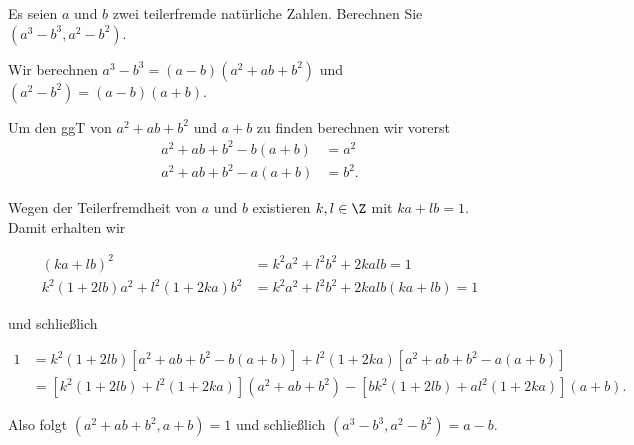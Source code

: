 
\begin{exercise}

Es seien $a$ und $b$ zwei teilerfremde natürliche Zahlen.
Berechnen Sie $(a^3 - b^3, a^2 - b^2)$.

\end{exercise}


\begin{solution}

Wir berechnen $a^3-b^3 = (a-b)(a^2 + ab + b^2)$ und $(a^2 - b^2) = (a-b)(a+b)$.

Um den ggT von $a^2+ab+b^2$ und $a+b$ zu finden berechnen wir vorerst
\begin{align*}
    a^2 + ab + b^2 - b(a+b) &= a^2 \\
    a^2 + ab + b^2 - a(a+b) &= b^2.
\end{align*}

Wegen der Teilerfremdheit von $a$ und $b$ 
existieren $k,l \in \Z$ mit $ka + lb = 1$. Damit erhalten wir

\begin{align*}
    (ka + l b)^2 &= k^2a^2 + l^2b^2 + 2kalb = 1 \\
    k^2(1 + 2lb)a^2 + l^2(1 + 2ka)b^2 &= k^2a^2 + l^2b^2 + 2kalb(ka + l b)
    = 1
\end{align*}

und schließlich

\begin{align*}
    1 &= k^2(1 + 2lb)[a^2 + ab + b^2 - b(a+b)] + l^2(1 + 2ka)[a^2 + ab + b^2 - a(a+b)] \\
    &=  [k^2(1 + 2lb) + l^2(1 + 2ka)](a^2 + ab + b^2) - [b k^2(1 + 2lb) + al^2(1 + 2ka)](a+b).
\end{align*}

Also folgt $(a^2 + ab + b^2, a + b) = 1$ und schließlich $(a^3 - b^3, a^2 - b^2) = a - b$.

\end{solution}

